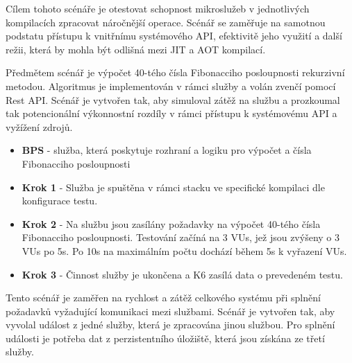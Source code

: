 
Cílem tohoto scénáře je otestovat schopnost mikroslužeb v jednotlivých kompilacích zpracovat náročnější operace. Scénář se zaměřuje na samotnou podstatu přístupu k vnitřnímu systémového API, efektivitě jeho využití a další režii, která by mohla být odlišná mezi JIT a AOT kompilací.


Předmětem scénář je výpočet 40-tého čísla Fibonacciho posloupnosti rekurzivní metodou. Algoritmus je implementován v rámci služby a volán zvenčí pomocí Rest API. Scénář je vytvořen tak, aby simuloval zátěž na službu a prozkoumal tak potencionální výkonnostní rozdíly v rámci přístupu k systémovému API a vyžížení zdrojů.



\begin{itemize}
    \item \textbf{BPS} - služba, která poskytuje rozhraní a logiku pro výpočet a čísla Fibonacciho posloupnosti
\end{itemize}


\begin{itemize}
    \item \textbf{Krok 1} - Služba je spuštěna v rámci stacku ve specifické kompilaci dle konfigurace testu.
    \item \textbf{Krok 2} - Na službu jsou zasílány požadavky na výpočet 40-tého čísla Fibonacciho posloupnosti. Testování začíná na 3 VUs, jež jsou zvýšeny o 3 VUs po 5s. Po 10s na maximálním počtu dochází během 5s k vyřazení VUs.
    \item \textbf{Krok 3} - Činnost služby je ukončena a K6 zasílá data o prevedeném testu.
\end{itemize}


Tento scénář je zaměřen na rychlost a zátěž celkového systému při splnění požadavků vyžadující komunikaci mezi službami. Scénář je vytvořen tak, aby vyvolal událost z jedné služby, která je zpracována jinou službou. Pro splnění události je potřeba dat z perzistentního úložiště, která jsou získána ze třetí služby.



